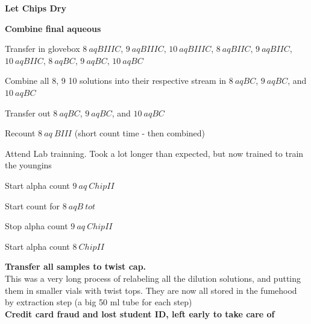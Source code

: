 \documentclass[idxtotoc,hyperref,openany,oneside]{labbook} %
\newcommand{\cmark}{\ding{51}}%
\newcommand{\done}{\rlap{$\square$}{\raisebox{2pt}{\large\hspace{1pt}\cmark}}%
  \hspace{-2.5pt}}
\begin{document}
\textbf{Let Chips Dry}

\textbf{Combine final aqueous}
\begin{todolist}
\item[\done]{Transfer in glovebox $\boxed{8\ aqBIIIC}$,
  $\boxed{9\ aqBIIIC}$,
  $\boxed{10\ aqBIIIC}$,
  $\boxed{8\ aqBIIC}$,
  $\boxed{9\ aqBIIC}$,
  $\boxed{10\ aqBIIC}$,
  $\boxed{8\ aqBC}$,
  $\boxed{9\ aqBC}$,
  $\boxed{10\ aqBC}$}
\item[\done]{Combine all 8, 9 10 solutions into their respective stream
  in $\boxed{8\ aqBC}$, $\boxed{9\ aqBC}$, and $\boxed{10\ aqBC}$}
\item[\done]{Transfer out $\boxed{8\ aqBC}$, $\boxed{9\ aqBC}$, and $\boxed{10\ aqBC}$}
\item[\done]{Recount $\boxed{8\ aq\ BIII}$ (short count time - then combined)}
\end{todolist}


Attend Lab trainning. Took a lot longer than expected, but now trained to train the
youngins







\begin{todolist}
\item[\done]{Start alpha count $\boxed{9\ aq\ ChipII}$}
\item[\done]{Start count for $\boxed{8\ aqB\ tot}$}
\item[\done]{Stop alpha count $\boxed{9\ aq\ ChipII}$}
\item[\done]{Start alpha count $\boxed{8\ ChipII}$}  
\end{todolist}

\textbf{Transfer all samples to twist cap.} \\

This was a very long process of
relabeling all the dilution solutions, and putting them in smaller vials
with twist tops. They are now all stored in the fumehood by extraction
step (a big 50 ml tube for each step)\\

\textbf{Credit card fraud and lost student ID, left early to take care of}
\end{document}
